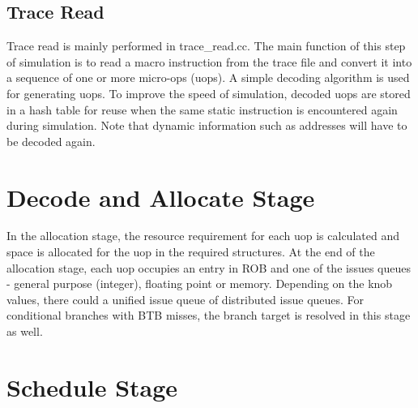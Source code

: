\subsection{Trace Read} 

Trace read is mainly performed in trace\_read.cc. The main function of this
step of simulation is to read a macro instruction from the trace file and
convert it into a sequence of one or more micro-ops (uops). A simple decoding
algorithm is used for generating uops. To improve the speed of simulation,
decoded uops are stored in a hash table for reuse when the same
static instruction is encountered again during simulation. Note that
dynamic information such as addresses will have to be decoded again. 



\section{Decode and  Allocate Stage}



In the allocation stage, the resource requirement for each uop is calculated
and space is allocated for the uop in the required structures. At the end of the
allocation stage, each uop occupies an entry in ROB and one of the issues
queues - general purpose (integer), floating point or memory. Depending on the
knob values, there could a unified issue queue of distributed issue queues. For
conditional branches with BTB misses, the branch target is resolved in this
stage as well.




\section{Schedule Stage}


